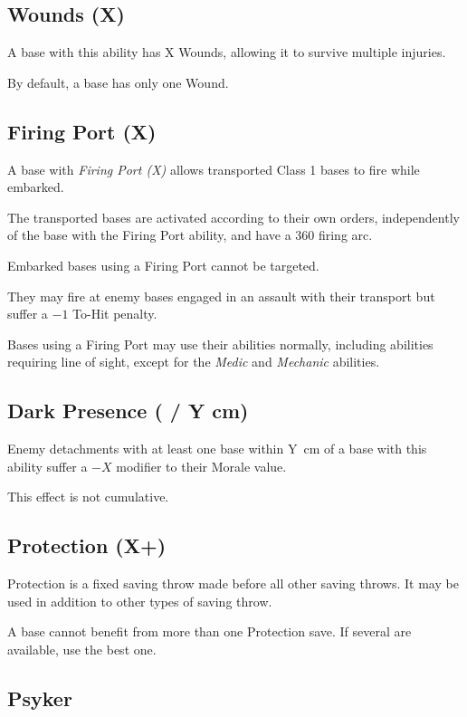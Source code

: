 \subsection{Wounds (X)}

A base with this ability has X Wounds, allowing it to survive multiple injuries.

By default, a base has only one Wound.

\subsection{Firing Port (X)}

A base with \textit{Firing Port (X)} allows transported Class 1 bases to fire while embarked.

The transported bases are activated according to their own orders, independently of the base with the Firing Port ability, and have a 360\textdegree{} firing arc.

Embarked bases using a Firing Port cannot be targeted.

They may fire at enemy bases engaged in an assault with their transport but suffer a $-1$ To-Hit penalty.

Bases using a Firing Port may use their abilities normally, including abilities requiring line of sight, except for the \textit{Medic} and \textit{Mechanic} abilities.

\subsection{Dark Presence ( / Y cm)}

Enemy detachments with at least one base within Y~cm of a base with this ability suffer a $-X$ modifier to their Morale value.

This effect is not cumulative.

\subsection{Protection (X+)}

Protection is a fixed saving throw made before all other saving throws. It may be used in addition to other types of saving throw.

A base cannot benefit from more than one Protection save. If several are available, use the best one.

\subsection{Psyker}

